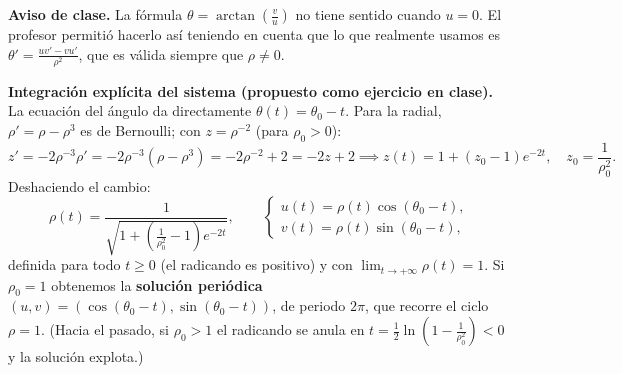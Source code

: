 {\begin{center}
    \end{center}

    \textbf{Aviso de clase.} La fórmula $\theta = \arctan\left( \frac{v}{u} \right)$ no tiene sentido cuando $u = 0$. El profesor permitió hacerlo así teniendo en cuenta que lo que realmente usamos es $\theta' = \frac{u v' - v u'}{\rho^2}$, que es válida siempre que $\rho \neq 0$.

    \textbf{Integración explícita del sistema (propuesto como ejercicio en clase).} La ecuación del ángulo da directamente $\theta(t) = \theta_0 - t$. Para la radial, $\rho' = \rho - \rho^3$ es de Bernoulli; con $z = \rho^{-2}$ (para $\rho_0 > 0$):
    \[
        z' = -2 \rho^{-3} \rho' = -2 \rho^{-3} (\rho - \rho^3) = -2 \rho^{-2} + 2 = -2z + 2 \implies z(t) = 1 + \left( z_0 - 1 \right) e^{-2t}, \quad z_0 = \frac{1}{\rho_0^2}.
    \]
    Deshaciendo el cambio:
    \[
        \rho(t) = \frac{1}{\sqrt{1 + \left( \frac{1}{\rho_0^2} - 1 \right) e^{-2t}}}, \qquad
        \begin{cases}
            u(t) = \rho(t) \cos(\theta_0 - t), \\
            v(t) = \rho(t) \sin(\theta_0 - t),
        \end{cases}
    \]
    definida para todo $t \ge 0$ (el radicando es positivo) y con $\lim_{t \to +\infty} \rho(t) = 1$. Si $\rho_0 = 1$ obtenemos la \textbf{solución periódica} $(u, v) = (\cos(\theta_0 - t), \sin(\theta_0 - t))$, de periodo $2\pi$, que recorre el ciclo $\rho = 1$. (Hacia el pasado, si $\rho_0 > 1$ el radicando se anula en $t = \frac{1}{2} \ln\left( 1 - \frac{1}{\rho_0^2} \right) < 0$ y la solución explota.)
}


